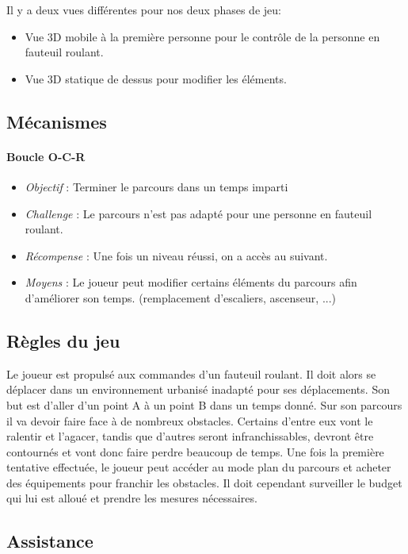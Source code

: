 \documentclass[a4paper,11pt]{article}
\begin{document}
Il y a deux vues différentes pour nos deux phases de jeu: 
\begin{itemize}
\item Vue 3D mobile à la première personne pour le contrôle de la personne en fauteuil roulant.
\item Vue 3D statique de dessus pour modifier les éléments.
\end{itemize}

\subsection{Mécanismes}
\paragraph{Boucle O-C-R}
\begin{itemize}
\item \textit{Objectif} : Terminer le parcours dans un temps imparti
\item \textit{Challenge} : Le parcours n’est pas adapté pour une personne en fauteuil roulant.
\item \textit{Récompense} : Une fois un niveau réussi, on a accès au suivant.
\item \textit{Moyens} : Le joueur peut modifier certains éléments du parcours afin d’améliorer son temps. (remplacement d’escaliers, ascenseur, ...)
\end{itemize}

\subsection{Règles du jeu}

Le joueur est propulsé aux commandes d’un fauteuil roulant. Il doit alors se déplacer dans un environnement urbanisé inadapté pour ses déplacements. Son but est d’aller d’un point A à un point B dans un temps donné. Sur son parcours il va devoir faire face à de nombreux obstacles. Certains d’entre eux vont le ralentir et l’agacer, tandis que d’autres seront infranchissables, devront être contournés et vont donc faire perdre beaucoup de temps. Une fois la première tentative effectuée, le joueur peut accéder au mode plan du parcours et acheter des équipements pour franchir les obstacles. Il doit cependant surveiller le budget qui lui est alloué et prendre les mesures nécessaires.

\subsection{Assistance}
\end{document}
